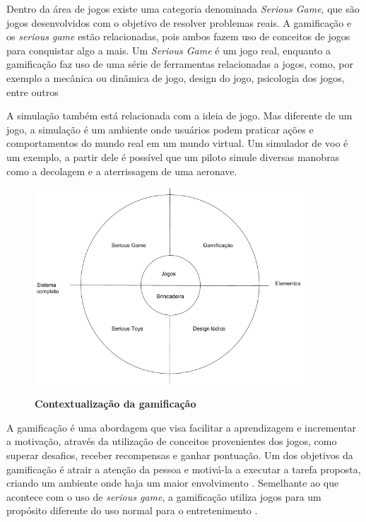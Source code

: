 \documentclass[
	12pt,				%
	oneside,			%
	a4paper,			%
	english,			%
	french,				%
	spanish,			%
	brazil,				%
	]{abntex2}
\begin{document}
Dentro da área de jogos existe uma categoria denominada \textit{Serious Game}, que são jogos desenvolvidos com o objetivo de resolver problemas reais. A gamificação e os \textit{serious game} estão relacionadas, pois ambos fazem uso de conceitos de jogos para conquistar algo a mais. Um \textit{Serious Game} é um jogo real, enquanto a gamificação faz uso de uma série de ferramentas relacionadas a jogos, como, por exemplo a mecânica ou dinâmica de jogo, design do jogo, psicologia dos jogos, entre outros \cite{dorling2012software}

A simulação também está relacionada com a ideia de jogo. Mas diferente de um jogo, a simulação é um ambiente onde usuários podem praticar ações e comportamentos do mundo real em um mundo virtual. Um simulador de voo é um exemplo, a partir dele é possível que um piloto simule diversas manobras como a decolagem e a aterrissagem de uma aeronave.

\begin{figure}[ht]
\centering
\caption{\textbf{Contextualização da gamificação }}
\includegraphics[width=0.9\textwidth]{imagens/gamificacao.png}
\label{fig:gamificacao}
\end{figure}

A gamificação é uma abordagem que visa facilitar a aprendizagem e incrementar a motivação, através da utilização de conceitos provenientes dos jogos, como superar desafios, receber recompensas e ganhar pontuação. Um dos objetivos da gamificação é atrair a atenção da pessoa e motivá-la a executar a tarefa proposta, criando um ambiente onde haja um maior envolvimento \cite{kaap:2014}. Semelhante ao que acontece com o uso de \textit{serious game}, a gamificação utiliza jogos para um propósito diferente do uso normal para o entretenimento \cite{deterding2011game}.
\end{document}

